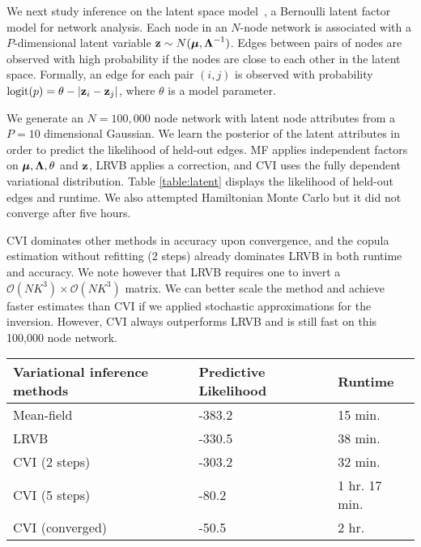We next study inference on the latent space
model~\citep{hoff2001latent}, a Bernoulli latent factor model for
network analysis. Each node in an $N$-node network is associated with
a $P$-dimensional latent variable $\boldsymbol{\mathbf{z}}\sim N(\boldsymbol{\mathbf{\mu}},\boldsymbol{\mathbf{\Lambda}}^{-1})$.
Edges between pairs of nodes are observed with high probability if the
nodes are close to each other in the latent space. Formally, an edge
for each pair $(i,j)$ is observed with probability $\mathrm{logit}(p)=
\theta - |\boldsymbol{\mathbf{z}}_i - \boldsymbol{\mathbf{z}}_j|$, where $\theta$ is a model parameter.

We generate an $N=100,000$ node network with latent node attributes
from a $P=10$ dimensional Gaussian. We learn the posterior of the
latent attributes in order to predict the likelihood of held-out
edges. \gls{MF} applies independent factors on $\boldsymbol{\mathbf{\mu}},
\boldsymbol{\mathbf{\Lambda}},\theta$ and $\boldsymbol{\mathbf{z}}$, \gls{LRVB} applies a correction, and
\gls{CVI} uses the fully dependent variational distribution. Table
\ref{table:latent} displays the likelihood of held-out edges and runtime. We also attempted Hamiltonian Monte Carlo but it did not
converge after five hours.

\Gls{CVI} dominates other methods in accuracy upon convergence, and
the copula estimation without refitting (2 steps) already dominates
\gls{LRVB} in both runtime and accuracy. We note however that
\gls{LRVB} requires one to invert a
$\mathcal{O}(NK^3)\times\mathcal{O}(NK^3)$ matrix. We can better scale
the method and achieve faster estimates than \gls{CVI} if we applied
stochastic approximations for the inversion. However, \gls{CVI} always
outperforms \gls{LRVB} and is still fast on this 100,000 node network.

\begin{table}[t]
  \centering
  \begin{tabular}{lll}
  \toprule
  Variational inference methods & Predictive Likelihood & Runtime\\
  \midrule
  {Mean-field} & -383.2 & 15 min.\\
  \gls{LRVB} & -330.5 & 38 min.\\
  \gls{CVI} (2 steps) & -303.2 & 32 min.\\
  \gls{CVI} (5 steps) & -80.2 & 1 hr. 17 min.\\
  \gls{CVI} (converged) & -50.5 & 2 hr.\\
  \bottomrule
  \end{tabular}
\end{table}


